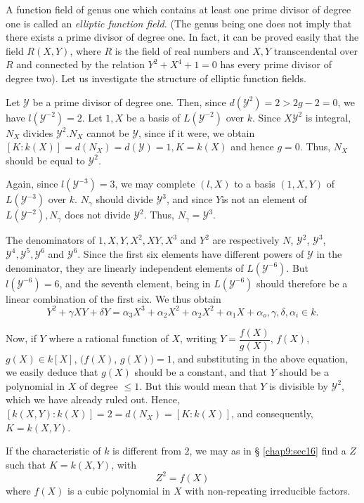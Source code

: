 A function field of genus one which contains at least one prime
divisor of degree one is called an \textit{ elliptic function field.}
(The genus being one does not imply that there exists a prime divisor
of degree one. In fact, it can be proved easily that the field $R(X,
Y)$, where $R$ is the field of real numbers and $X, Y$ transcendental
over $R$ and connected by the relation $Y^2 + X^4 + 1 = 0$ has every
prime divisor of degree two). Let us investigate the structure of
elliptic function fields. 

Let $\mathscr{Y}$ be a prime divisor of degree one. Then, since $d
(\mathscr{Y}^2) = 2 > 2g - 2 = 0$, we have $l (\mathscr{Y}^{-2}) =
2$. Let $1, X$ be a basis of $L(\mathscr{Y}^{-2})$ over $k$. Since $X
\mathscr{Y}^2$ is integral, $N_{X}$ divides $\mathscr{Y}^2
. N_{X}$ cannot be $\mathscr{Y}$, since if it were, we obtain
$[K : k(X)] = d(N_{X}) = d(\mathscr{Y}) = 1, K = k(X)$ and
hence $g = 0$. Thus, $N_{X}$ should be equal to
$\mathscr{Y}^2$. 

Again, since $l(\mathscr{Y}^{-3}) = 3$, we may complete $(l, X)$ to a
basis $(1, X, Y)$ of $L(\mathscr{Y}^{-3})$ over $k$. $N_\gamma$ should
divide $\mathscr{Y}^3$, and since $Y$\pageoriginale is not an element of $L
(\mathscr{Y}^{-2}), N_\gamma$ does not divide $\mathscr{Y}^2$. Thus, $N_\gamma =
\mathscr{Y}^3$. 

The denominators of $1, X, Y, X^2, XY, X^3$ and $Y^2$ are respectively
$N$, $\mathscr{Y}^2$, $\mathscr{Y}^3$, $\mathscr{Y}^4, \mathscr{Y}^5,
\mathscr{Y}^6$ and $\mathscr{Y}^6$. Since the first six elements have
different powers of $\mathscr{Y}$ in the denominator, they are
linearly independent elements of $L(\mathscr{Y}^{-6})$. But
$l(\mathscr{Y}^{-6}) = 6$, and the seventh element, being in
$L(\mathscr{Y}^{-6})$ should therefore be a linear combination of the
first six. We thus obtain 
$$
Y^2 + \gamma X Y + \delta Y = \alpha_3 X^3 + \alpha_2 X^2 +
\alpha_2 X^2 + \alpha_1 X + \alpha_o, \gamma, \delta, \alpha_i \in k. 
$$

Now, if $Y$ where a rational function of $X$, writing $Y =
\dfrac{f(X)}{g(X)}$, $f(X)$, $g(X) \in k[X]$, $(f(X)$, $g(X)) = 1$, and
substituting in the above equation, we easily deduce that $g(X)$
should be a constant, and that $Y$ should be a polynomial in $X$ of
degree $\le 1$. But this would mean that $Y$ is divisible by
$\mathscr{Y}^2$, which we have already ruled out. Hence, $[k(X, Y) : k
  (X)] = 2 = d (N_{X}) = [K : k(X)]$, and consequently, $K =
k(X, Y)$. 

If the characteristic of $k$ is different from $2$, we may as in \S
\ref{chap9:sec16} find a $Z$ such that $K =k (X, Y)$, with 
$$
Z^2 = f(X)
$$
where $f(X)$ is a cubic polynomial in $X$ with non-repeating
irreducible factors. 

